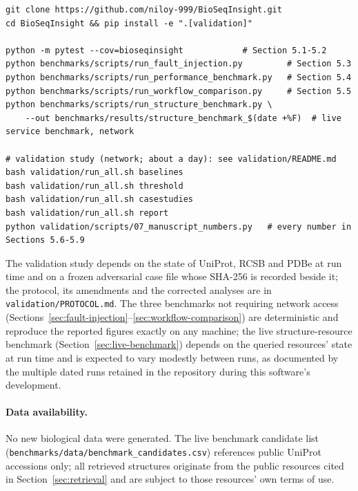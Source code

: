 \begin{lstlisting}
git clone https://github.com/niloy-999/BioSeqInsight.git
cd BioSeqInsight && pip install -e ".[validation]"

python -m pytest --cov=bioseqinsight            # Section 5.1-5.2
python benchmarks/scripts/run_fault_injection.py         # Section 5.3
python benchmarks/scripts/run_performance_benchmark.py   # Section 5.4
python benchmarks/scripts/run_workflow_comparison.py     # Section 5.5
python benchmarks/scripts/run_structure_benchmark.py \
    --out benchmarks/results/structure_benchmark_$(date +%F)  # live service benchmark, network

# validation study (network; about a day): see validation/README.md
bash validation/run_all.sh baselines
bash validation/run_all.sh threshold
bash validation/run_all.sh casestudies
bash validation/run_all.sh report
python validation/scripts/07_manuscript_numbers.py   # every number in Sections 5.6-5.9
\end{lstlisting}

The validation study depends on the state of UniProt, RCSB and PDBe at run time
and on a frozen adversarial case file whose SHA-256 is recorded beside it; the
protocol, its amendments and the corrected analyses are in
\texttt{validation/PROTOCOL.md}. The three benchmarks not requiring network access
(Sections~\ref{sec:fault-injection}--\ref{sec:workflow-comparison}) are
deterministic and reproduce the reported figures exactly on any machine; the
live structure-resource benchmark (Section~\ref{sec:live-benchmark}) depends
on the queried resources' state at run time and is expected to vary modestly
between runs, as documented by the multiple dated runs retained in the
repository during this software's development.

\paragraph{Data availability.} No new biological data were generated. The
live benchmark candidate list
(\texttt{benchmarks/data/benchmark\_candidates.csv}) references public
UniProt accessions only; all retrieved structures originate from the public
resources cited in Section~\ref{sec:retrieval} and are subject to those
resources' own terms of use.
